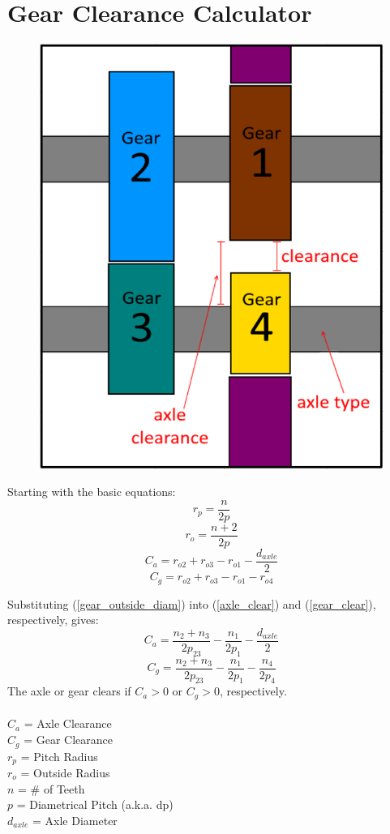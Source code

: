 \documentclass[11pt,a4paper,titlepage]{article}
\begin{document}
	\bigskip
	\section{Gear Clearance Calculator}
	\begin{figure}[H]
		\centering
		\includegraphics[width=0.4\linewidth]{Gear_Clear}
	\end{figure}
	
	Starting with the basic equations:
	\begin{equation} \label{gear_pitch_diam}
		r_p = \frac{n}{2p}
	\end{equation}
	\begin{equation} \label{gear_outside_diam}
		r_o = \frac{n+2}{2p}
	\end{equation}
	\begin{equation} \label{axle_clear}
		C_a = r_{o2} + r_{o3} - r_{o1} - \frac{d_{axle}}{2}
	\end{equation}
	\begin{equation} \label{gear_clear}
		C_g = r_{o2} + r_{o3} - r_{o1} - r_{o4}
	\end{equation}
	
	\newpage
	Substituting (\ref{gear_outside_diam}) into (\ref{axle_clear}) and (\ref{gear_clear}), respectively, gives:
	\begin{equation}
		C_a = \frac{n_2 + n_3}{2 p_{23}} - \frac{n_1}{2 p_1} - \frac{d_{axle}}{2}
	\end{equation}
	\begin{equation}
		C_g = \frac{n_2 + n_3}{2 p_{23}} - \frac{n_1}{2 p_1} - \frac{n_4}{2 p_4}
	\end{equation}
	The axle or gear clears if $C_a > 0$ or $C_g > 0$, respectively. \\ \\
	$C_a$ = Axle Clearance \\
	$C_g$ = Gear Clearance \\
	$r_p$ = Pitch Radius \\
	$r_o$ = Outside Radius \\
	$n$ = \# of Teeth \\
	$p$ = Diametrical Pitch (a.k.a. dp)\\
	$d_{axle}$ = Axle Diameter
	
\end{document}
